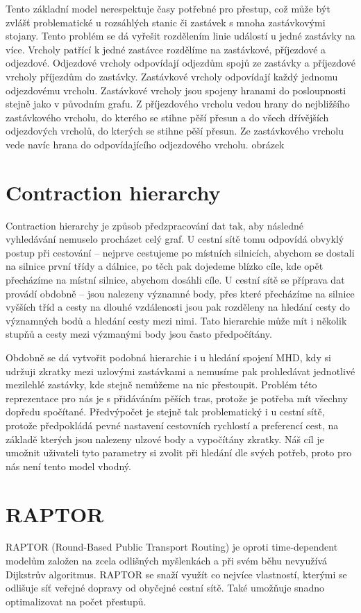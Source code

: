 Tento základní model nerespektuje časy potřebné pro přestup, což může být
zvlášť problematické u rozsáhlých stanic či zastávek s mnoha zastávkovými
stojany. Tento problém se dá vyřešit rozdělením linie událostí u jedné zastávky
na více. Vrcholy patřící k jedné zastávce rozdělíme na zastávkové, příjezdové a
odjezdové. Odjezdové vrcholy odpovídají odjezdům spojů ze zastávky a příjezdové
vrcholy příjezdům do zastávky. Zastávkové vrcholy odpovídají každý jednomu
odjezdovému vrcholu. Zastávkové vrcholy jsou spojeny hranami do posloupnosti
stejně jako v původním grafu. Z příjezdového vrcholu vedou hrany do nejbližšího
zastávkového vrcholu, do kterého se stihne pěší přesun a do všech dřívějších
odjezdových vrcholů, do kterých se stihne pěší přesun. Ze zastávkového vrcholu
vede navíc hrana do odpovídajícího odjezdového vrcholu. 
\TODO obrázek
\section{Contraction hierarchy}
Contraction hierarchy \cite{CH} je způsob předzpracování dat tak, aby následné
vyhledávání nemuselo procházet celý graf. U cestní sítě tomu odpovídá obvyklý
postup při cestování -- nejprve cestujeme po místních silnicích, abychom se
dostali na silnice první třídy a dálnice, po těch pak dojedeme blízko cíle, kde
opět přecházíme na místní silnice, abychom dosáhli cíle. U cestní sítě se
příprava dat provádí obdobně -- jsou nalezeny významné body, přes které
přecházíme na silnice vyšších tříd a cesty na dlouhé vzdálenosti jsou pak
rozděleny na hledání cesty do významných bodů a hledání cesty mezi nimi. Tato
hierarchie může mít i několik stupňů a cesty mezi výzmanými body jsou často
předpočítány.

Obdobně se dá vytvořit podobná hierarchie i u hledání spojení MHD, kdy si
udržuji zkratky mezi uzlovými zastávkami a nemusíme pak prohledávat jednotlivé
mezilehlé zastávky, kde stejně nemůžeme na nic přestoupit. Problém této
reprezentace pro nás je s přidáváním pěších tras, protože je potřeba mít všechny dopředu
spočítané. Předvýpočet je stejně tak problematický i u cestní sítě, protože
předpokládá pevné nastavení cestovních rychlostí a preferencí cest, na základě
kterých jsou nalezeny ulzové body a vypočítány zkratky. Náš cíl je umožnit
uživateli tyto parametry si zvolit při hledání dle svých potřeb, proto pro nás
není tento model vhodný. 

\section{RAPTOR}
RAPTOR (Round-Based Public Transport Routing) \citep*{RAPTOR} je oproti
time-dependent modelům založen na zcela odlišných myšlenkách a při svém běhu
nevyužívá Dijkstrův algoritmus. RAPTOR se snaží využít co nejvíce vlastností,
kterými se odlišuje síť veřejné dopravy od obyčejné cestní sítě. Také umožňuje
snadno optimalizovat na počet přestupů.

